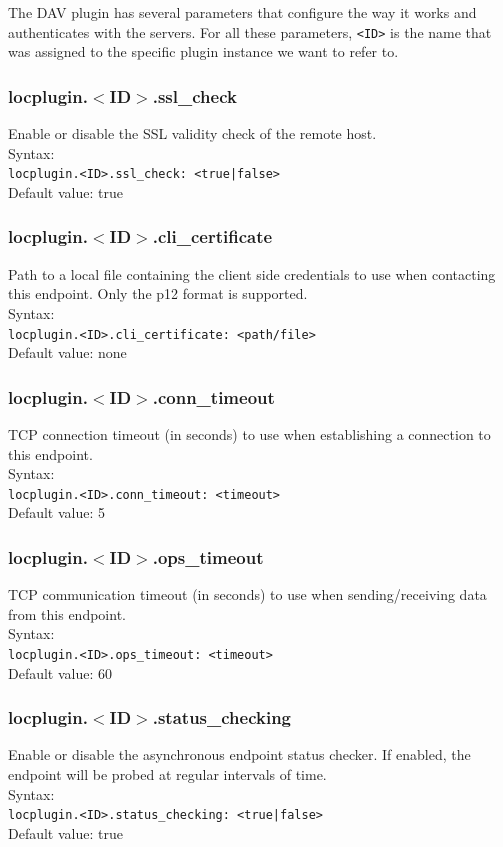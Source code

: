 \documentclass[12pt]{article} %
\begin{document}
The DAV plugin has several parameters that configure the way it works and authenticates with the servers. For all these parameters, \verb"<ID>" is the name that was assigned to the specific plugin instance we want to refer to.

\subsubsection{locplugin.$<$ID$>$.ssl\_check}
Enable or disable the SSL validity check of the remote host.\\
Syntax:\\
\verb"locplugin.<ID>.ssl_check: <true|false>"\\
Default value: true\\
\subsubsection{locplugin.$<$ID$>$.cli\_certificate}
Path to a local file containing the client side credentials to use when contacting this endpoint. Only the p12 format is supported.\\
Syntax:\\
\verb"locplugin.<ID>.cli_certificate: <path/file>"\\
Default value: none\\
\subsubsection{locplugin.$<$ID$>$.conn\_timeout}
TCP connection timeout (in seconds) to use when establishing a connection to this endpoint. \\
Syntax:\\
\verb"locplugin.<ID>.conn_timeout: <timeout>"\\
Default value: 5\\
\subsubsection{locplugin.$<$ID$>$.ops\_timeout}
TCP communication timeout (in seconds) to use when sending/receiving data from this endpoint.\\
Syntax:\\
\verb"locplugin.<ID>.ops_timeout: <timeout>"\\
Default value: 60\\
\subsubsection{locplugin.$<$ID$>$.status\_checking}
Enable or disable the asynchronous endpoint status checker. If enabled, the endpoint will be probed at regular intervals of time.\\
Syntax:\\
\verb"locplugin.<ID>.status_checking: <true|false>"\\
Default value: true\\
\end{document}
